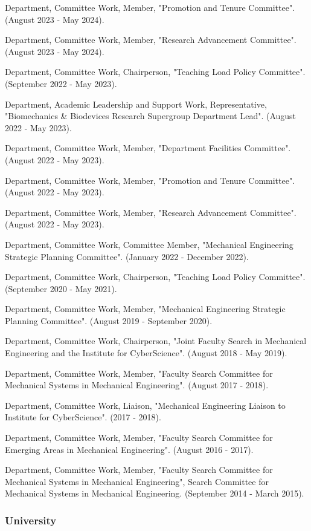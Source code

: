 \documentclass[
]{article}
\begin{document}
Department, Committee Work, Member, "Promotion and Tenure Committee".
(August 2023 - May 2024).

Department, Committee Work, Member, "Research Advancement Committee".
(August 2023 - May 2024).

Department, Committee Work, Chairperson, "Teaching Load Policy
Committee". (September 2022 - May 2023).

Department, Academic Leadership and Support Work, Representative,
"Biomechanics \& Biodevices Research Supergroup Department Lead".
(August 2022 - May 2023).

Department, Committee Work, Member, "Department Facilities Committee".
(August 2022 - May 2023).

Department, Committee Work, Member, "Promotion and Tenure Committee".
(August 2022 - May 2023).

Department, Committee Work, Member, "Research Advancement Committee".
(August 2022 - May 2023).

Department, Committee Work, Committee Member, "Mechanical Engineering
Strategic Planning Committee". (January 2022 - December 2022).

Department, Committee Work, Chairperson, "Teaching Load Policy
Committee". (September 2020 - May 2021).

Department, Committee Work, Member, "Mechanical Engineering Strategic
Planning Committee". (August 2019 - September 2020).

Department, Committee Work, Chairperson, "Joint Faculty Search in
Mechanical Engineering and the Institute for CyberScience". (August 2018
- May 2019).

Department, Committee Work, Member, "Faculty Search Committee for
Mechanical Systems in Mechanical Engineering". (August 2017 - 2018).

Department, Committee Work, Liaison, "Mechanical Engineering Liaison to
Institute for CyberScience". (2017 - 2018).

Department, Committee Work, Member, "Faculty Search Committee for
Emerging Areas in Mechanical Engineering". (August 2016 - 2017).

Department, Committee Work, Member, "Faculty Search Committee for
Mechanical Systems in Mechanical Engineering", Search Committee for
Mechanical Systems in Mechanical Engineering. (September 2014 - March
2015).

\subsubsection{University}\label{university}
\end{document}
